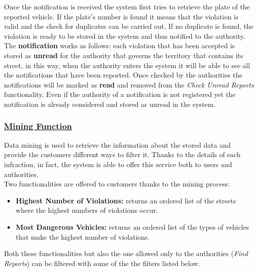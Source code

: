 		Once the notification is received the system first tries to retrieve the plate of the reported vehicle. If the plate's number is found it means that the violation is valid and the check for duplicates can be carried out. If no duplicate is found, the violation is ready to be stored in the system and thus notified to the authority. The \textbf{notification} works as follows: each violation that has been accepted is stored as \textbf{unread} for the authority that governs the territory that contains its street, in this way, when the authority enters the system it will be able to see all the notifications that have been reported. Once checked by the authorities the notifications will be marked as \textbf{read} and removed from the \emph{Check Unread Reports} functionality. Even if the authority of a notification is not registered yet the notification is already considered and stored as unread in the system.

	\subsubsection[Statistics Function]{\hyperlink{toc}{Mining Function}}
		Data mining is used to retrieve the information about the stored data and provide the customers different ways to filter it. Thanks to the details of each infraction, in fact, the system is able to offer this service both to users and authorities. \\
		
		Two functionalities are offered to customers thanks to the mining process: 
		
		\begin{itemize}
			\item \textbf{Highest Number of Violations:} returns an ordered list of the streets where the highest numbers of violations occur.
			\item \textbf{Most Dangerous Vehicles:} returns an ordered list of the types of vehicles that make the highest number of violations.
		\end{itemize}
		
		 Both these functionalities but also the one allowed only to the authorities (\emph{Find Reports}) can be filtered with some of the the filters listed below.
			
